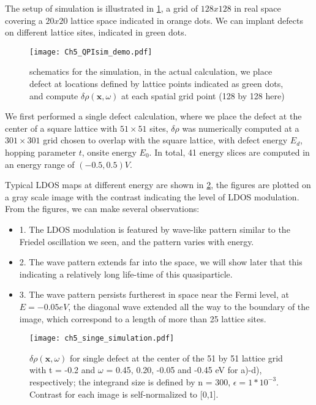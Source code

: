 The setup of simulation is illustrated in \ref{fig:ch5_qpisim_demo}, a grid of $128x128$ in real space covering a $20x20$ lattice space indicated in orange dots. We can implant defects on different lattice sites, indicated in green dots. 

\begin{figure}
	\centering
	\texttt{[image: Ch5\_QPIsim\_demo.pdf]}
	\caption{schematics for the simulation, in the actual calculation, we place defect at locations defined by lattice points indicated as green dots, and compute $\delta\rho(\textbf{x},\omega)$ at each spatial grid point (128 by 128 here)}
	\label{fig:ch5_qpisim_demo}
\end{figure}

We first performed a single defect calculation, where we place the defect at the center of a square lattice with $51\times51$ sites, $\delta\rho$ was numerically computed at a $301\times301$ grid chosen to overlap with the square lattice, with defect energy $E_d$, hopping parameter $t$, onsite energy $E_0$. In total, 41 energy slices are computed in an energy range of $(-0.5, 0.5)V$.  

Typical \ac{LDOS} maps at different energy are shown in \ref{fig:ch5_single_scattering}, the figures are plotted on a gray scale image with the contrast indicating the level of \ac{LDOS} modulation. From the figures, we can make several observations:
\begin{itemize}
	\item 1. The \ac{LDOS} modulation is featured by wave-like pattern similar to the Friedel oscillation we seen, and the pattern varies with energy. 
	\item 2. The wave pattern extends far into the space, we will show later that this indicating a relatively long life-time of this quasiparticle. 
	\item 3. The wave pattern persists furtherest in space near the Fermi level, at $E=-0.05eV$, the diagonal wave extended all the way to the boundary of the image, which correspond to a length of more than 25 lattice sites. 
\end{itemize}

\begin{figure}
	\centering
	\texttt{[image: ch5\_singe\_simulation.pdf]} %
	\caption{$\delta\rho(\textbf{x},\omega)$ for single defect at the center of the 51 by 51 lattice grid with t = -0.2 and $\omega$ = 0.45, 0.20, -0.05 and -0.45 eV for a)-d), respectively; the integrand size is defined by n = 300, $\epsilon = 1*10^{-3}$. Contrast for each image is self-normalized to [0,1].}
	\label{fig:ch5_single_scattering}
\end{figure}

